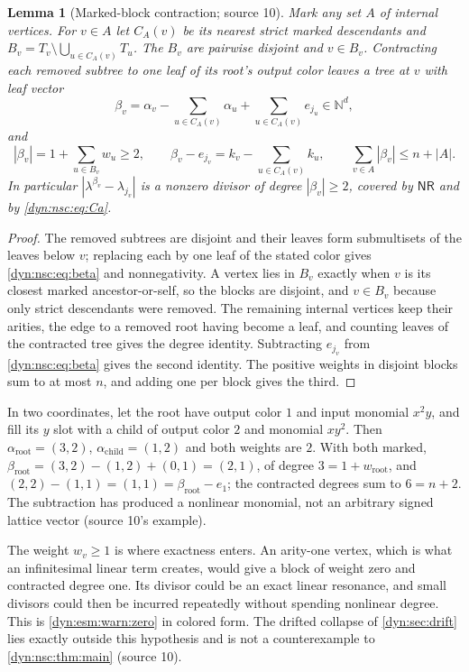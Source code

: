 \documentclass[11pt,letterpaper]{article}
\newtheorem{lemma}[lemma]{Lemma}
\theoremstyle{definition}
\theoremstyle{remark}
\newcommand{\N}{\mathbb N}
\newcommand{\nres}{\mathsf{NR}}
\numberwithin{equation}{section}
\begin{document}
\begin{lemma}[Marked-block contraction; source 10]\label{dyn:nsc:lem:blocks}
Mark any set $A$ of internal vertices. For $v\in A$ let $C_A(v)$ be its
nearest strict marked descendants and
$B_v=T_v\setminus\bigcup_{u\in C_A(v)}T_u$. The $B_v$ are pairwise disjoint
and $v\in B_v$. Contracting each removed subtree to one leaf of its root's
output color leaves a tree at $v$ with leaf vector
\begin{equation}\label{dyn:nsc:eq:beta}
 \beta_v=\alpha_v-\sum_{u\in C_A(v)}\alpha_u+\sum_{u\in C_A(v)}e_{j_u}\in\N^{d},
\end{equation}
and
\begin{equation}\label{dyn:nsc:eq:blockfacts}
 |\beta_v|=1+\sum_{u\in B_v}w_u\ge2,\qquad
 \beta_v-e_{j_v}=k_v-\sum_{u\in C_A(v)}k_u,\qquad
 \sum_{v\in A}|\beta_v|\le n+|A| .
\end{equation}
In particular $|\lambda^{\beta_v}-\lambda_{j_v}|$ is a nonzero divisor of
degree $|\beta_v|\ge2$, covered by $\nres$ and by \eqref{dyn:nsc:eq:Ca}.
\end{lemma}
\begin{proof}
The removed subtrees are disjoint and their leaves form submultisets of the
leaves below $v$; replacing each by one leaf of the stated color gives
\eqref{dyn:nsc:eq:beta} and nonnegativity. A vertex lies in $B_v$ exactly
when $v$ is its closest marked ancestor-or-self, so the blocks are disjoint,
and $v\in B_v$ because only strict descendants were removed. The remaining
internal vertices keep their arities, the edge to a removed root having
become a leaf, and counting leaves of the contracted tree gives the degree
identity. Subtracting $e_{j_v}$ from \eqref{dyn:nsc:eq:beta} gives the
second identity. The positive weights in disjoint blocks sum to at most $n$,
and adding one per block gives the third.
\end{proof}

In two coordinates, let the root have output color $1$ and input monomial
$x^{2}y$, and fill its $y$ slot with a child of output color $2$ and
monomial $xy^{2}$. Then $\alpha_{\mathrm{root}}=(3,2)$,
$\alpha_{\mathrm{child}}=(1,2)$ and both weights are $2$. With both marked,
$\beta_{\mathrm{root}}=(3,2)-(1,2)+(0,1)=(2,1)$, of degree $3=1+w_{\mathrm{root}}$,
and $(2,2)-(1,1)=(1,1)=\beta_{\mathrm{root}}-e_1$; the contracted degrees sum
to $6=n+2$. The subtraction has produced a nonlinear monomial, not an
arbitrary signed lattice vector (source 10's example).

The weight $w_v\ge1$ is where exactness enters. An arity-one vertex, which
is what an infinitesimal linear term creates, would give a block of weight
zero and contracted degree one. Its divisor could be an exact linear
resonance, and small divisors could then be incurred repeatedly without
spending nonlinear degree. This is \cref{dyn:esm:warn:zero} in colored form.
The drifted collapse of \cref{dyn:sec:drift} lies exactly outside this
hypothesis and is not a counterexample to \cref{dyn:nsc:thm:main}
(source 10).
\end{document}
